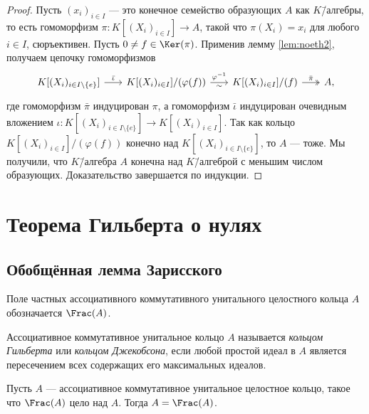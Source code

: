\documentclass[
	extrafontsizes,
	11pt,
	hyphens,
]{memoir}
\begin{document}
\begin{proof}
Пусть \((x_i)_{i \in I}\) --- это конечное семейство образующих \(A\) как \(K\)\=/алгебры, то есть гомоморфизм \(\pi : K[(X_i)_{i \in I}] \to A\), такой что \(\pi(X_i) = x_i\) для любого \(i \in I\), сюръективен.
Пусть \(0 \neq f \in \Ker(\pi)\).
Применив лемму \ref{lem:noeth2}, получаем цепочку гомоморфизмов
\[
\begin{tikzcd}[column sep = scriptsize]
K[(X_i)_{i \in I \setminus \{e\}}]
\ar{r}{\bar{\iota}} &
K[(X_i)_{i \in I}] / (\varphi(f))
\ar{r}{\varphi^{-1}}[']{\sim} &
K[(X_i)_{i \in I}] / (f)
\ar[twoheadrightarrow]{r}{\bar{\pi}} &
A,
\end{tikzcd}
\]
где гомоморфизм \(\bar{\pi}\) индуцирован \(\pi\), а гомоморфизм \(\bar{\iota}\) индуцирован очевидным вложением \(\iota : K[(X_i)_{i \in I \setminus \{e\}}] \to K[(X_i)_{i \in I}]\).
Так как кольцо \(K[(X_i)_{i \in I}] / (\varphi(f))\) конечно над \(K[(X_i)_{i \in I \setminus \{e\}}]\), то \(A\) --- тоже.
Мы получили, что \(K\)\=/алгебра \(A\) конечна над \(K\)\=/алгеброй с меньшим числом образующих. Доказательство завершается по индукции.
\end{proof}


\section{Теорема Гильберта о нулях}

\subsection{Обобщённая лемма Зарисского}

\begin{notation}
Поле частных ассоциативного коммутативного унитального целостного кольца \(A\) обозначается \(\Frac(A)\).
\end{notation}

\begin{definition}
Ассоциативное коммутативное унитальное кольцо \(A\) называется \emph{кольцом Гильберта} или \emph{кольцом Джекобсона}, если любой простой идеал в \(A\) является пересечением всех содержащих его максимальных идеалов.
\end{definition}

\begin{theorem}
Пусть \(A\) --- ассоциативное коммутативное унитальное целостное кольцо, такое что \(\Frac(A)\) цело над \(A\).
Тогда \(A = \Frac(A)\).
\end{theorem}
\end{document}
